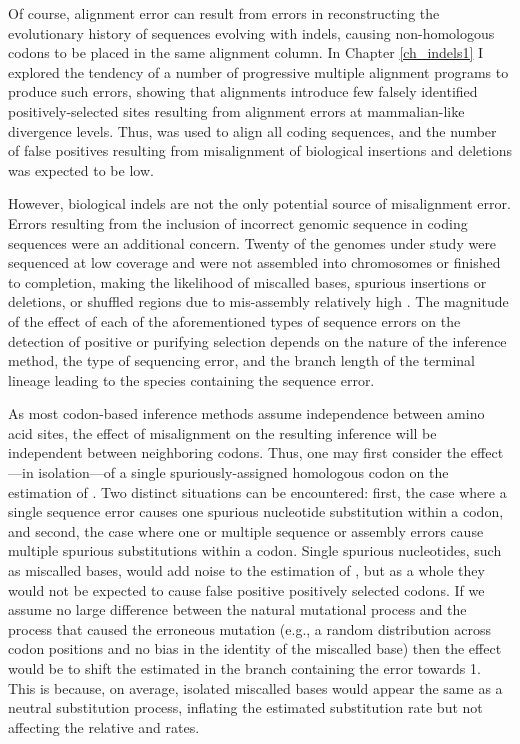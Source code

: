Of course, alignment error can result from errors in reconstructing
the evolutionary history of sequences evolving with indels, causing
non-homologous codons to be placed in the same alignment column. In
Chapter \ref{ch_indels1} I explored the tendency of a number of
progressive multiple alignment programs to produce such errors,
showing that \prankc alignments introduce few falsely identified
positively-selected sites resulting from alignment errors at
mammalian-like divergence levels. Thus, \prankc was used to align all
coding sequences, and the number of false positives resulting from
misalignment of biological insertions and deletions was expected to be
low.

However, biological indels are not the only potential source of
misalignment error. Errors resulting from the inclusion of incorrect
genomic sequence in coding sequences were an additional
concern. Twenty of the genomes under study were sequenced at low
coverage and were not assembled into chromosomes or finished to
completion, making the likelihood of miscalled bases, spurious
insertions or deletions, or shuffled regions due to mis-assembly
relatively high \citep{Green2007}. The magnitude of the effect of each
of the aforementioned types of sequence errors on the detection of
positive or purifying selection depends on the nature of the inference
method, the type of sequencing error, and the branch length of the
terminal lineage leading to the species containing the sequence error.

As most codon-based inference methods assume independence between
amino acid sites, the effect of misalignment on the resulting
inference will be independent between neighboring codons. Thus, one
may first consider the effect---in isolation---of a single
spuriously-assigned homologous codon on the \ml estimation of
\omg. Two distinct situations can be encountered: first, the case
where a single sequence error causes one spurious nucleotide
substitution within a codon, and second, the case where one or
multiple sequence or assembly errors cause multiple spurious
substitutions within a codon. Single spurious nucleotides, such as
miscalled bases, would add noise to the estimation of \omg, but as a
whole they would not be expected to cause false positive positively
selected codons. If we assume no large difference between the natural
mutational process and the process that caused the erroneous mutation
(e.g., a random distribution across codon positions and no bias in the
identity of the miscalled base) then the effect would be to shift the
estimated \omg in the branch containing the error towards 1. This is
because, on average, isolated miscalled bases would appear the same as
a neutral substitution process, inflating the estimated substitution
rate but not affecting the relative \nsyn and \syn rates.

